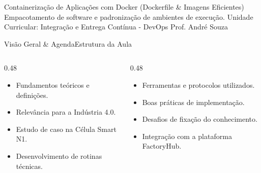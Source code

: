 
\senaicover
  {Containerização de Aplicações com Docker (Dockerfile & Imagens Eficientes)}
  {Empacotamento de software e padronização de ambientes de execução.}
  {Unidade Curricular: Integração e Entrega Contínua - DevOps}
  {Prof. André Souza}

\begin{senaiframe}{Visão Geral \& Agenda}{Estrutura da Aula}
  \begin{columns}[t]
    \begin{column}{0.48\textwidth}
      \begin{tcolorbox}[senaibluecard, title={1. Conceitos Chave}]
        \begin{itemize}
          \item Fundamentos teóricos e definições.
          \item Relevância para a Indústria 4.0.
        \end{itemize}
      \end{tcolorbox}
      \vspace{4pt}
      \begin{tcolorbox}[senaiambercard, title={3. Aplicação Prática}]
        \begin{itemize}
          \item Estudo de caso na Célula Smart N1.
          \item Desenvolvimento de rotinas técnicas.
        \end{itemize}
      \end{tcolorbox}
    \end{column}
    \begin{column}{0.48\textwidth}
      \begin{tcolorbox}[senairedcard, title={2. Detalhamento Técnico}]
        \begin{itemize}
          \item Ferramentas e protocolos utilizados.
          \item Boas práticas de implementação.
        \end{itemize}
      \end{tcolorbox}
      \vspace{4pt}
      \begin{tcolorbox}[senaigreencard, title={4. Exercícios \& Avaliação}]
        \begin{itemize}
          \item Desafios de fixação do conhecimento.
          \item Integração com a plataforma FactoryHub.
        \end{itemize}
      \end{tcolorbox}
    \end{column}
  \end{columns}
\end{senaiframe}

